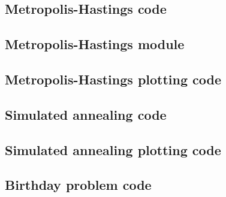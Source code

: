 \documentclass[twocolumn]{myarticle}
\begin{document}

\vspace{10pt}

\subsection{Metropolis-Hastings code}
\label{subsec:metropolis_hastings_code}


\vspace{10pt}

\subsection{Metropolis-Hastings module}
\label{subsec:metropolis_hastings_module}


\vspace{10pt}

\subsection{Metropolis-Hastings plotting code}
\label{subsec:metropolis_hastings_plotting_code}


\vspace{10pt}

\subsection{Simulated annealing code}
\label{subsec:simulated_anealing_code}


\vspace{10pt}

\subsection{Simulated annealing plotting code}
\label{subsec:simulated_anealing_plotting_code}


\vspace{10pt}

\subsection{Birthday problem code}
\label{subsec:birthday_problem_code}
\end{document}
